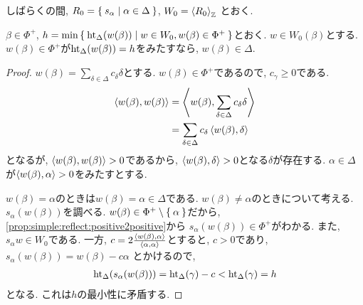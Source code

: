 しばらくの間,
$R_0=\Set{s_\alpha|\alpha\in\Delta}$,
$W_0=\Braket{R_0}_{\mathbb{Z}}$
とおく.
\begin{lemma}
  \label{lem:minimumhtissimple}
  $\beta\in\Phi^+$,
  $h=\min\Set{\operatorname{ht}_\Delta(w(\beta))|w\in W_0, w(\beta)\in \Phi^+}$とおく.
  $w\in W_0(\beta)$とする.
  $w(\beta)\in\Phi^+$が$\operatorname{ht}_\Delta(w(\beta))=h$をみたすなら,
  $w(\beta)\in\Delta$.
\end{lemma}
\begin{proof}
  $w(\beta)=\sum_{\delta\in\Delta}c_\delta\delta$とする.
  $w(\beta)\in\Phi^+$であるので,
  $c_\gamma\geq 0$である.
  \begin{align*}
    \Braket{w(\beta),w(\beta)}
    &=\Braket{w(\beta),\sum_{\delta\in\Delta}c_\delta\delta}\\
    &=\sum_{\delta\in\Delta}c_\delta\Braket{w(\beta),\delta}
  \end{align*}
  となるが, $\Braket{w(\beta),w(\beta)}>0$であるから,
  $\Braket{w(\beta),\delta}>0$となる$\delta$が存在する.
  $\alpha\in\Delta$が$\Braket{w(\beta),\alpha}>0$をみたすとする.

  $w(\beta)=\alpha$のときは$w(\beta)=\alpha\in\Delta$である.
  $w(\beta)\neq\alpha$のときについて考える.
  $s_\alpha(w(\beta))$を調べる.
  $w(\beta)\in\Phi^+\setminus\Set{\alpha}$だから,
  \cref{prop:simple:reflect:positive2positive}から
  $s_\alpha(w(\beta))\in\Phi^+$がわかる.
  また, $s_\alpha w\in W_0$である.
  一方,  
  $c=2\frac{\Braket{w(\beta),\alpha}}{\Braket{\alpha,\alpha}}$とすると,
  $c>0$であり,
  $s_\alpha(w(\beta))=w(\beta)-c\alpha$
  とかけるので,
  \begin{align*}
    \operatorname{ht}_\Delta(s_\alpha(w(\beta)))
    =\operatorname{ht}_\Delta(\gamma)-c < \operatorname{ht}_\Delta(\gamma)=h
  \end{align*}
  となる.
  これは$h$の最小性に矛盾する.
\end{proof}


